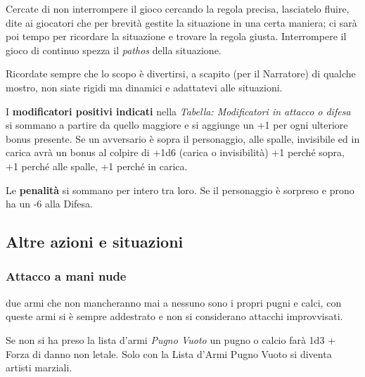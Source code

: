 \medskip

\begin{multicols}{2}

\begin{narratore}
Cercate di non interrompere il gioco cercando la regola precisa, lasciatelo fluire, dite ai giocatori che per brevità gestite la situazione in una certa maniera; ci sarà poi tempo per ricordare la situazione e trovare la regola giusta. Interrompere il gioco di continuo spezza il \emph{pathos} della situazione.
\end{narratore}

\begin{narratore}
	Ricordate sempre che lo scopo è divertirsi, a scapito (per il Narratore) di qualche mostro, non siate rigidi ma dinamici e adattatevi alle situazioni.
\end{narratore}

I \textbf{modificatori positivi indicati} nella \emph{Tabella: Modificatori in attacco o difesa} si sommano a partire da quello maggiore e si aggiunge un +1 per ogni ulteriore bonus presente. Se un avversario è sopra il personaggio, alle spalle, invisibile ed in carica avrà un bonus al colpire di +1d6 (carica o invisibilità) +1 perché sopra, +1 perché alle spalle, +1 perché in carica.

Le \textbf{penalità} si sommano per intero tra loro. Se il personaggio è sorpreso e prono ha un -6 alla Difesa.


\subsection{Altre azioni e situazioni} \label{AltreAzioni}

\subsubsection{Attacco a mani nude}  \label{attaccomaninude}

due armi che non mancheranno mai a nessuno sono i propri pugni e calci, con queste armi si è sempre addestrato e non si considerano attacchi improvvisati.

Se non si ha preso la lista d'armi \emph{Pugno Vuoto} un pugno o calcio farà 1d3 + Forza di danno non letale. Solo con la Lista d'Armi Pugno Vuoto si diventa artisti marziali.


\end{multicols}
